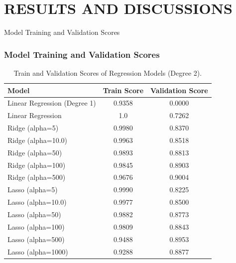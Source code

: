 \section{RESULTS AND DISCUSSIONS}
\label{results_and_discussions_section}


\begin{frame}{Model Training and Validation Scores}
    \frametitle{Model Training and Validation Scores}
    \begin{table}[H]
        \centering
        \tiny %
        \begin{tabular}{|l|c|c|}
        \hline
        \textbf{Model} & \textbf{Train Score} & \textbf{Validation Score} \\
        \hline
        Linear Regression (Degree 1) & 0.9358 & 0.0000 \\
        Linear Regression & 1.0 & 0.7262 \\
        Ridge (alpha=5) & 0.9980 & 0.8370 \\
        Ridge (alpha=10.0) & 0.9963 & 0.8518 \\
        Ridge (alpha=50) & 0.9893 & 0.8813 \\
        Ridge (alpha=100) & 0.9845 & 0.8903 \\
        \rowcolor{yellow} %
        Ridge (alpha=500) & 0.9676 & 0.9004 \\
        Lasso (alpha=5) & 0.9990 & 0.8225 \\
        Lasso (alpha=10.0) & 0.9977 & 0.8500 \\
        Lasso (alpha=50) & 0.9882 & 0.8773 \\
        Lasso (alpha=100) & 0.9809 & 0.8843 \\
        Lasso (alpha=500) & 0.9488 & 0.8953 \\
        Lasso (alpha=1000) & 0.9288 & 0.8877 \\
        \hline
        \end{tabular}
        \caption{Train and Validation Scores of Regression Models (Degree 2).}
        \label{tab:model_scores}
    \end{table}
\end{frame}

